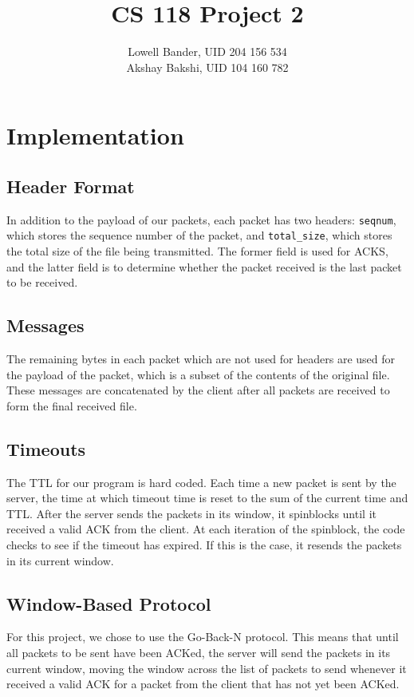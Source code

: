 \documentclass{article}
\begin{document}
\title{CS 118 Project 2}
\author{Lowell Bander, UID 204 156 534\\Akshay Bakshi, UID 104 160 782}
\maketitle
\section{Implementation}
\subsection{Header Format}
In addition to the payload of our packets, each packet has two headers: \texttt{seqnum}, which stores the sequence number of the packet, and \texttt{total\_size}, which stores the total size of the file being transmitted. The former field is used for ACKS, and the latter field is to determine whether the packet received is the last packet to be received.
\subsection{Messages}
The remaining bytes in each packet which are not used for headers are used for the payload of the packet, which is a subset of the contents of the original file. These messages are concatenated by the client after all packets are received to form the final received file.
\subsection{Timeouts}
The TTL for our program is hard coded. Each time a new packet is sent by the server, the time at which timeout time is reset to the sum of the current time and TTL. After the server sends the packets in its window, it spinblocks until it received a valid ACK from the client. At each iteration of the spinblock, the code checks to see if the timeout has expired. If this is the case, it resends the packets in its current window.
\subsection{Window-Based Protocol}
For this project, we chose to use the Go-Back-N protocol. This means that until all packets to be sent have been ACKed, the server will send the packets in its current window, moving the window across the list of packets to send whenever it received a valid ACK for a packet from the client that has not yet been ACKed. \\
\end{document}
